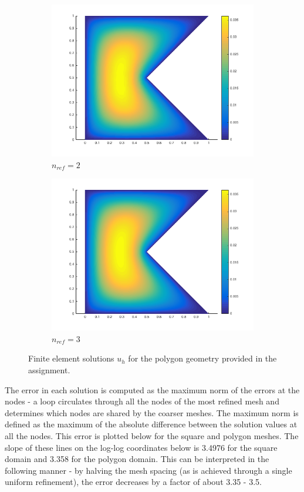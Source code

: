 \documentclass[10pt]{article}
\begin{document}
\begin{figure}[H]
\begin{subfigure}[b]{0.45\textwidth}
                \centering
                \includegraphics[width=\textwidth]{poly2.png}
                \caption{\(n_{ref}=2\)}
        \end{subfigure}%
                \begin{subfigure}[b]{0.45\textwidth}
                \centering
                \includegraphics[width=\textwidth]{poly3.png}
                \caption{\(n_{ref}=3\)}
        \end{subfigure}%
        \caption{Finite element solutions \(u_h\) for the polygon geometry provided in the assignment.}
        \label{fig:31}
\end{figure}

The error in each solution is computed as the maximum norm of the errors at the nodes - a loop circulates through all the nodes of the most refined mesh and determines which nodes are shared by the coarser meshes. The maximum norm is defined as the maximum of the absolute difference between the solution values at all the nodes. This error is plotted below for the square and polygon meshes. The slope of these lines on the log-log coordinates below is 3.4976 for the square domain and 3.358 for the polygon domain. This can be interpreted in the following manner - by halving the mesh spacing (as is achieved through a single uniform refinement), the error decreases by a factor of about 3.35 - 3.5. 
\end{document}
